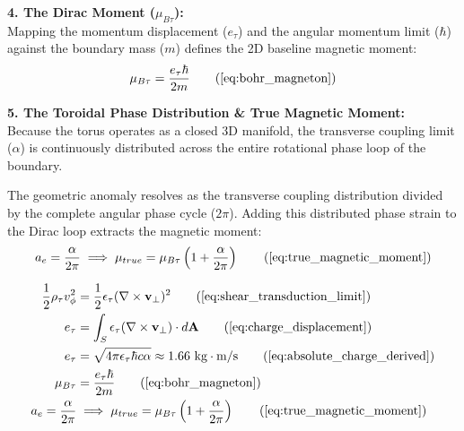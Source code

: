 \vspace{0.2 cm}

\textbf{4. The Dirac Moment ($\mu_{B\tau}$):} \\
Mapping the momentum displacement ($e_{\tau}$) and the angular momentum limit ($\hbar$) against the boundary mass ($m$) defines the 2D baseline magnetic moment:
\begin{equation}
    \mu_{B\tau} = \frac{e_{\tau} \hbar}{2m} \tag{\ref{eq:bohr_magneton}}
\end{equation}

\vspace{0.2 cm}

\textbf{5. The Toroidal Phase Distribution \& True Magnetic Moment:} \\
Because the torus operates as a closed 3D manifold, the transverse coupling limit ($\alpha$) is continuously distributed across the entire rotational phase loop of the boundary. 

The geometric anomaly resolves as the transverse coupling distribution divided by the complete angular phase cycle ($2\pi$). Adding this distributed phase strain to the Dirac loop extracts the magnetic moment:
\begin{equation}
    a_e = \frac{\alpha}{2\pi} \implies \mu_{true} = \mu_{B\tau} \left( 1 + \frac{\alpha}{2\pi} \right) \tag{\ref{eq:true_magnetic_moment}}
\end{equation}

\begin{tcolorbox}[recallbox, title={\ref{box:kinematic_charge}. The Kinematic Origin of Charge \& The Magnetic Anomaly}]
\begin{align}
    \frac{1}{2}\rho_{\tau} v_\phi^2 &= \frac{1}{2}\epsilon_{\tau} (\nabla \times \mathbf{v}_{\perp})^2 \tag{\ref{eq:shear_transduction_limit}} \\
    e_{\tau} &= \int_S \epsilon_{\tau} (\nabla \times \mathbf{v}_{\perp}) \cdot d\mathbf{A} \tag{\ref{eq:charge_displacement}} \\
    e_{\tau} &= \sqrt{4\pi \epsilon_{\tau} \hbar c \alpha} \approx 1.66 \text{ kg}\cdot\text{m/s} \tag{\ref{eq:absolute_charge_derived}} \\
    \mu_{B\tau} &= \frac{e_{\tau} \hbar}{2m} \tag{\ref{eq:bohr_magneton}} \\
    a_e = \frac{\alpha}{2\pi} &\implies \mu_{true} = \mu_{B\tau} \left( 1 + \frac{\alpha}{2\pi} \right) \tag{\ref{eq:true_magnetic_moment}}
\end{align}
\end{tcolorbox}
